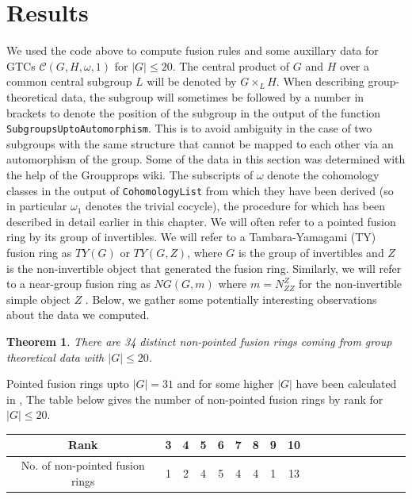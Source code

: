 \documentclass[a4paper, 10pt]{book}
\newtheorem{Thm}{Theorem}[chapter]
\theoremstyle{definition}
\numberwithin{equation}{chapter}
\newcommand\lstl{\lstinline}
\newcommand\C{\mathcal C}
\begin{document}
\section{Results}\label{results}
We used the code above to compute fusion rules and some auxillary data for GTCs $\C(G, H, \omega, 1)$ for $|G|\leq 20$. The central product of $G$ and $H$ over a common central subgroup $L$ will be denoted by $G\times_L H$. When describing group-theoretical data, the subgroup will sometimes be followed by a number in brackets to denote the position of the subgroup in the output of the function \lstl{SubgroupsUptoAutomorphism}. This is to avoid ambiguity in the case of two subgroups with the same structure that cannot be mapped to each other via an automorphism of the group. Some of the data in this section was determined with the help of the Groupprops wiki\cite{groupprops}. The subscripts of $\omega$ denote the cohomology classes in the output of \lstl{CohomologyList} from which they have been derived (so in particular $\omega_1$ denotes the trivial cocycle), the procedure for which has been described in detail earlier in this chapter.  We will often refer to a pointed fusion ring by its group of invertibles. We will refer to a Tambara-Yamagami (TY) fusion ring as $TY(G)$ or $TY(G, Z)$, where $G$ is the group of invertibles and $Z$ is the non-invertible object that generated the fusion ring. Similarly, we will refer to a near-group fusion ring as $NG(G, m)$ where $m=N^Z_{ZZ}$ for the non-invertible simple object $Z$ . Below, we gather some potentially interesting observations about the data we computed.
\begin{Thm}
There are 34 distinct non-pointed fusion rings coming from group theoretical data with $|G|\leq 20$. 
\end{Thm}
Pointed fusion rings upto $|G|=31$ and for some higher $|G|$ have been calculated in \cite{2017arXiv170806538M},  
The table below gives the number of non-pointed fusion rings by rank for $|G|\leq 20$.
\begin{center}
\begin{tabular}{ | c |c |c |c |c |c |c |c |c |c |c |c |c |c |c |c |c |c |}
\hline
Rank &   3& 4 & 5 & 6  & 7 & 8 & 9 & 10 \\ 
\hline
 No. of non-pointed fusion rings  & 1 & 2 & 4 & 5 & 4 & 4 & 1 & 13 \\
\hline
\end{tabular}
\end{center}
\end{document}
